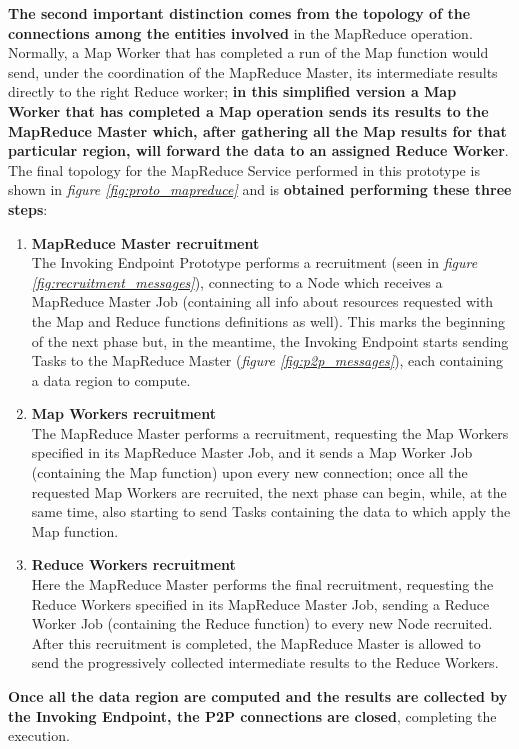 \textbf{The second important distinction comes from the topology of the connections among the entities involved} in the MapReduce operation. Normally, a Map Worker that has completed a run of the Map function would send, under the coordination of the MapReduce Master, its intermediate results directly to the right Reduce worker; \textbf{in this simplified version a Map Worker that has completed a Map operation sends its results to the MapReduce Master which, after gathering all the Map results for that particular region, will forward the data to an assigned Reduce Worker}. The final topology for the MapReduce Service performed in this prototype is shown in \textit{figure \ref{fig:proto_mapreduce}} and is \textbf{obtained performing these three steps}:
\begin{enumerate}
    \item \textbf{MapReduce Master recruitment}\\
    The Invoking Endpoint Prototype performs a recruitment (seen in \textit{figure \ref{fig:recruitment_messages}}), connecting to a Node which receives a MapReduce Master Job (containing all info about resources requested with the Map and Reduce functions definitions as well). This marks the beginning of the next phase but, in the meantime, the Invoking Endpoint starts sending Tasks to the MapReduce Master (\textit{figure \ref{fig:p2p_messages}}), each containing a data region to compute.
    \item \textbf{Map Workers recruitment}\\
    The MapReduce Master performs a recruitment, requesting the Map Workers specified in its MapReduce Master Job, and it sends a Map Worker Job (containing the Map function) upon every new connection; once all the requested Map Workers are recruited, the next phase can begin, while, at the same time, also starting to send Tasks containing the data to which apply the Map function.
    \item \textbf{Reduce Workers recruitment}\\
    Here the MapReduce Master performs the final recruitment, requesting the Reduce Workers specified in its MapReduce Master Job, sending a Reduce Worker Job (containing the Reduce function) to every new Node recruited. After this recruitment is completed, the MapReduce Master is allowed to send the progressively collected intermediate results to the Reduce Workers. 
\end{enumerate}

\textbf{Once all the data region are computed and the results are collected by the Invoking Endpoint, the P2P connections are closed}, completing the execution.

